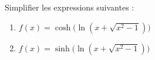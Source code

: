 
\begin{exercice}\label{exoautoanalyseCTU-14}



Simplifier les expressions suivantes :
\begin{enumerate}
\item $f(x)=\cosh\Big(\ln(x+\sqrt{x^2-1})\Big)$
\item $f(x)=\sinh\Big(\ln(x+\sqrt{x^2-1})\Big)$
\end{enumerate}





\end{exercice}
